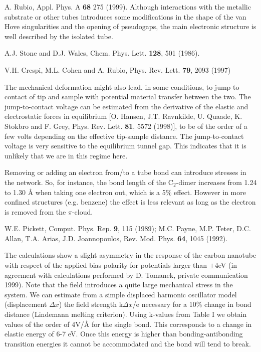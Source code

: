 \begin{multicols}{2}
\begin{thebibliography}{99}
 A. Rubio, Appl. Phys. A {\bf 68} 275 (1999).
Although interactions
with the metallic substrate or  other tubes introduces some modifications
in the shape of the van Hove singularities and the opening of
pseudogaps, the main
electronic structure is well described by the isolated tube.

 A.J. Stone and D.J. Wales, Chem. Phys. Lett. {\bf 128},
501 (1986).

  V.H. Crespi, M.L. Cohen and A. Rubio, Phys. Rev. Lett.
{\bf 79}, 2093 (1997)

 The mechanical deformation might also lead,
in some conditions, to jump to contact of tip and sample with
potential material transfer between the two. The jump-to-contact
voltage can be estimated from the derivative of the elastic and
electrostatic forces in equilibrium [O. Hansen, J.T. Ravnkilde, U.
Quaade, K. Stokbro and F. Grey, Phys. Rev. Lett. {\bf 81}, 5572
(1998)], to be of the order of a few volts depending on the
effective tip-sample distance. The jump-to-contact voltage is very
sensitive to the equilibrium tunnel gap. This indicates that it is
unlikely that we are in this regime here.

 Removing or adding an electron from/to a tube
bond can introduce stresses in the network. So, for instance, the
bond length of the C$_{2}$-dimer increases from 1.24 to 1.30 {\AA}
when taking one electron out, which is a 5\% effect. However in
more confined structures (e.g. benzene) the effect is less
relevant as long as the electron is removed from the $\pi$-cloud.

 W.E. Pickett, Comput. Phys. Rep. {\bf 9}, 115 (1989);
 M.C. Payne, M.P. Teter, D.C. Allan, T.A. Arias, J.D. Joannopoulos,
 Rev. Mod. Phys. {\bf 64}, 1045 (1992).


The calculations show a slight asymmetry  in the response of the
carbon nanotube with respect of the applied bias polarity for
potentials larger than $\pm 4$eV (in agreement with calculations
performed by D. Tomanek, private communication 1999). Note that
the field introduces a quite large mechanical stress in the
system.  We can estimate from a simple displaced harmonic
oscillator model (displacement $\Delta x$) the field strength
k$\Delta x$/e necessary for a 10\% change in bond distance
(Lindemann melting criterion\cite{Lindemann}). Using k-values from
Table I we obtain values of the order of 4V/{\AA} for the single
bond. This corresponds to a change in elastic energy of 6-7 eV.
Once this energy is higher than bonding-antibonding transition
energies it cannot be accommodated and the bond will tend to
break.



\end{thebibliography}
\end{multicols}
